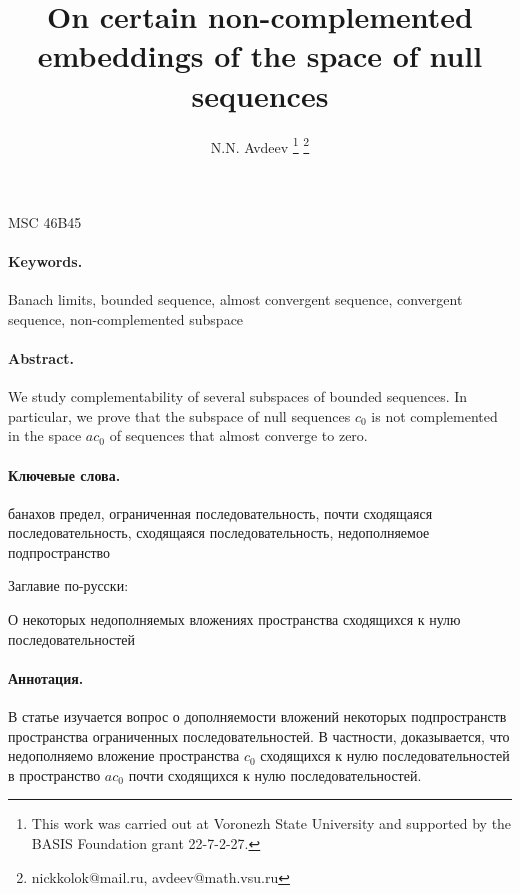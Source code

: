 \documentclass[a4paper,10pt]{article} %
\theoremstyle{plain}
\theoremstyle{definition}
\begin{document}

\title{
	On certain non-complemented embeddings of the space of null sequences
}

\author{
	N.N. Avdeev
	\footnote{
		This work was carried out at Voronezh State University and supported by the BASIS
		Foundation grant 22-7-2-27.
	}
	\footnote{nickkolok@mail.ru, avdeev@math.vsu.ru}
}

\maketitle

MSC 46B45

\paragraph{Keywords.}
	Banach limits,
	bounded sequence,
	almost convergent sequence,
	convergent sequence,
	non-complemented subspace


\paragraph{Abstract.}
We study complementability of several subspaces of bounded sequences.
In particular,
we prove that the subspace of null sequences $c_0$
is not complemented in the space $ac_0$ of sequences that almost converge to zero.



\paragraph{Ключевые слова.}
	банахов предел,
	ограниченная последовательность,
	почти сходящаяся последовательность,
	сходящаяся последовательность,
	недополняемое подпространство

Заглавие по-русски:

О некоторых недополняемых вложениях пространства сходящихся к нулю последовательностей


\paragraph{Аннотация.}
В статье изучается вопрос о дополняемости вложений некоторых подпространств пространства ограниченных последовательностей.
В частности, доказывается, что недополняемо вложение пространства $c_0$
сходящихся к нулю последовательностей
в пространство $ac_0$ почти сходящихся к нулю последовательностей.
\end{document}
